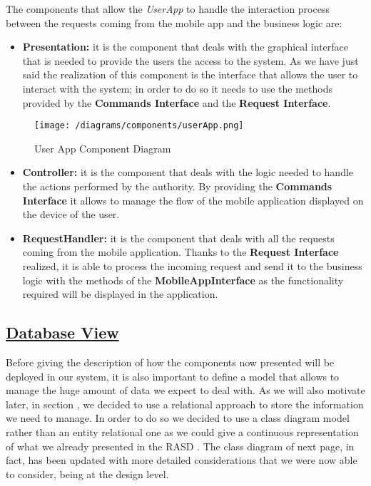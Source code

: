 			The components that allow the \emph{UserApp} to handle the interaction process between the requests coming from the mobile app and the business logic are:
			
			\begin{itemize}
				\item \textbf{Presentation:} it is the component that deals with the graphical interface that is needed to provide the users the access to the system. As we have just said the realization of this component is the interface that allows the user to interact with the system; in order to do so it needs to use the methods provided by the \textbf{Commands Interface} and the \textbf{Request Interface}.
			\end{itemize}
			
			\begin{figure}[ht]
				\centering
				\texttt{[image: /diagrams/components/userApp.png]}
				\caption{\label{fig:userAppComp} User App Component Diagram}
			\end{figure}
		
			\begin{itemize}
				\item \textbf{Controller:} it is the component that deals with the logic needed to handle the actions performed by the authority. By providing the \textbf{Commands Interface} it allows to manage the flow of the mobile application displayed on the device of the user.
				
				\item \textbf{RequestHandler:} it is the component that deals with all the requests coming from the mobile application. Thanks to the \textbf{Request Interface} realized, it is able to process the incoming request and send it to the business logic with the methods of the \textbf{MobileAppInterface} as the functionality required will be displayed in the application.
			\end{itemize}
			
	\subsection[Database View]{\hyperlink{toc}{Database View}}
		\label{sec:databaseView}
		
		Before giving the description of how the components now presented will be deployed in our system, it is also important to define a model that allows to manage the huge amount of data we expect to deal with. As we will also motivate later, in section , we decided to use a relational approach to store the information we need to manage. In order to do so we decided to use a class diagram model rather than an entity relational one as we could give a continuous representation of what we already presented in the RASD \cite{RASD}. The class diagram of next page, in fact, has been updated with more detailed considerations that we were now able to consider, being at the design level.\\
		
